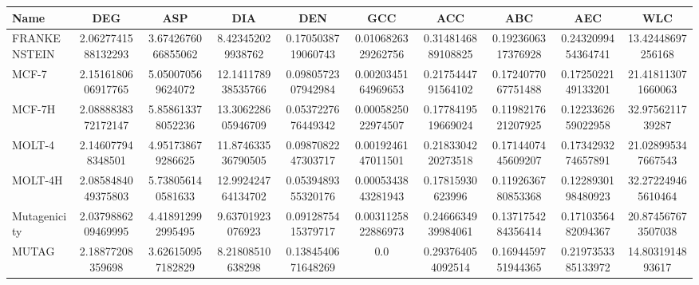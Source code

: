 \begin{sidewaystable} %
    \centering
    \small %
    \begin{tabular}{l
                    S[round-mode=places, round-precision=4]
                    S[round-mode=places, round-precision=4]
                    S[round-mode=places, round-precision=4]
                    S[round-mode=places, round-precision=4]
                    S[round-mode=places, round-precision=4]
                    S[round-mode=places, round-precision=4]
                    S[round-mode=places, round-precision=4]
                    S[round-mode=places, round-precision=4]
                    S[round-mode=places, round-precision=4]} %
        \toprule
        \textbf{Name} & \textbf{DEG} & \textbf{ASP} & \textbf{DIA} & \textbf{DEN} & \textbf{GCC} & \textbf{ACC} & \textbf{ABC} & \textbf{AEC} & \textbf{WLC} \\
        \midrule
        FRANKENSTEIN & 2.0627741588132293 & 3.6742676066855062 & 8.423452029938762 & 0.1705038719060743 & 0.0106826329262756 & 0.3148146889108825 & 0.1923606317376928 & 0.2432099454364741 & 13.42448697256168 \\ \hline
        MCF-7 & 2.1516180606917765 & 5.050070569624072 & 12.141178938535766 & 0.0980572307942984 & 0.0020345164969653 & 0.2175444791564102 & 0.1724077067751488 & 0.1725022149133201 & 21.418113071660063 \\ \hline
        MCF-7H & 2.0888838372172147 & 5.858613378052236 & 13.306228605946709 & 0.0537227676449342 & 0.0005825022974507 & 0.1778419519669024 & 0.1198217621207925 & 0.1223362659022958 & 32.9756211739287 \\ \hline
        MOLT-4 & 2.146077948348501 & 4.951738679286625 & 11.874633536790505 & 0.0987082247303717 & 0.0019246147011501 & 0.2183304220273518 & 0.1714407445609207 & 0.1734293274657891 & 21.028995347667543 \\ \hline
        MOLT-4H & 2.0858484049375803 & 5.738056140581633 & 12.992424764134702 & 0.0539489355320176 & 0.0005343843281943 & 0.17815930623996 & 0.1192636780853368 & 0.1228930198480923 & 32.272249465610464 \\ \hline
        Mutagenicity & 2.0379886209469995 & 4.418912992995495 & 9.63701923076923 & 0.0912875415379717 & 0.0031125822886973 & 0.2466634939984061 & 0.1371754284356414 & 0.1710356482094367 & 20.874567673507038 \\ \hline
        MUTAG & 2.18877208359698 & 3.626150957182829 & 8.21808510638298 & 0.1384540671648269 & 0.0 & 0.293764054092514 & 0.1694459751944365 & 0.2197353385133972 & 14.8031914893617 \\ \hline

\end{tabular}
\end{sidewaystable}
